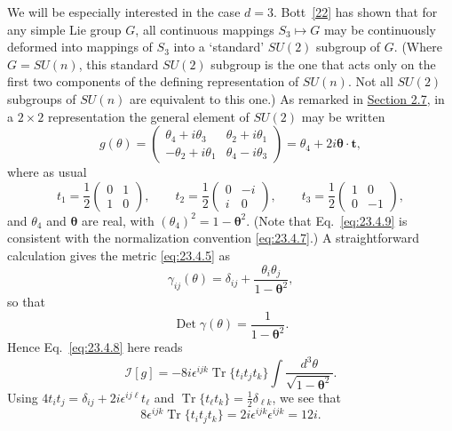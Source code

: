 We will be especially interested in the case $d=3$.
Bott~\hyperref[ch23-ref-22]{[22]} has shown that for any simple Lie group
$G$, all continuous mappings $S_3\mapsto G$ may be continuously deformed
into mappings of $S_3$ into a `standard' $SU(2)$ subgroup of $G$. (Where
$G=SU(n)$, this standard $SU(2)$ subgroup is the one that acts only on the
first two components of the defining representation of $SU(n)$. Not all
$SU(2)$ subgroups of $SU(n)$ are equivalent to this one.) As remarked in
\hyperref[sec:2.7]{Section 2.7}, in a $2\times2$ representation the general
element of $SU(2)$ may be written
\begin{equation}
g(\theta)=
\begin{pmatrix}
\theta_4+i\theta_3&\theta_2+i\theta_1\\
-\theta_2+i\theta_1&\theta_4-i\theta_3
\end{pmatrix}
=\theta_4+2i\boldsymbol{\theta}\cdot\mathbf t,
\tag{23.4.9}\label{eq:23.4.9}
\end{equation}
where as usual
\[
t_1=\frac12\begin{pmatrix}0&1\\1&0\end{pmatrix},
\qquad
t_2=\frac12\begin{pmatrix}0&-i\\i&0\end{pmatrix},
\qquad
t_3=\frac12\begin{pmatrix}1&0\\0&-1\end{pmatrix},
\]
and $\theta_4$ and $\boldsymbol{\theta}$ are real, with
$(\theta_4)^2=1-\boldsymbol{\theta}^2$. (Note that
Eq.~\eqref{eq:23.4.9} is consistent with the normalization convention
\eqref{eq:23.4.7}.) A straightforward calculation gives the metric
\eqref{eq:23.4.5} as
\begin{equation}
\gamma_{ij}(\theta)=\delta_{ij}
+\frac{\theta_i\theta_j}{1-\boldsymbol{\theta}^2},
\tag{23.4.10}\label{eq:23.4.10}
\end{equation}
so that
\begin{equation}
\operatorname{Det}\gamma(\theta)
=\frac{1}{1-\boldsymbol{\theta}^2}.
\tag{23.4.11}\label{eq:23.4.11}
\end{equation}
Hence Eq.~\eqref{eq:23.4.8} here reads
\[
\mathcal I[g]=-8i\epsilon^{ijk}\operatorname{Tr}\{t_it_jt_k\}
\int\frac{d^3\theta}{\sqrt{1-\boldsymbol{\theta}^2}}.
\]
Using $4t_it_j=\delta_{ij}+2i\epsilon^{ij\ell}t_\ell$ and
$\operatorname{Tr}\{t_\ell t_k\}=\frac12\delta_{\ell k}$, we see that
\[
8\epsilon^{ijk}\operatorname{Tr}\{t_it_jt_k\}
=2i\epsilon^{ijk}\epsilon^{ijk}=12i.
\]
